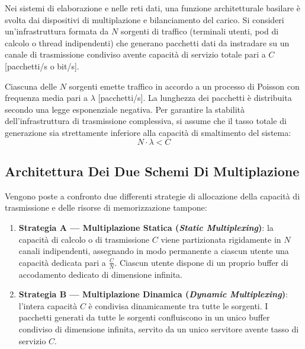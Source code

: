 \documentclass[11pt, a4paper]{article}
\begin{document}
Nei sistemi di elaborazione e nelle reti dati, una funzione architetturale basilare è svolta dai dispositivi di multiplazione e bilanciamento del carico. Si consideri un'infrastruttura formata da $N$ sorgenti di traffico (terminali utenti, pod di calcolo o thread indipendenti) che generano pacchetti dati da instradare su un canale di trasmissione condiviso avente capacità di servizio totale pari a $C$ [pacchetti/s o bit/s].


Ciascuna delle $N$ sorgenti emette traffico in accordo a un processo di Poisson con frequenza media pari a $\lambda$ [pacchetti/s]. La lunghezza dei pacchetti è distribuita secondo una legge esponenziale negativa. Per garantire la stabilità dell'infrastruttura di trasmissione complessiva, si assume che il tasso totale di generazione sia strettamente inferiore alla capacità di smaltimento del sistema:
\[
N \cdot \lambda < C
\]

\subsection{Architettura Dei Due Schemi Di Multiplazione}

Vengono poste a confronto due differenti strategie di allocazione della capacità di trasmissione e delle risorse di memorizzazione tampone:
\begin{enumerate}
    \item \textbf{Strategia A — Multiplazione Statica (\emph{Static Multiplexing})}: la capacità di calcolo o di trasmissione $C$ viene partizionata rigidamente in $N$ canali indipendenti, assegnando in modo permanente a ciascun utente una capacità dedicata pari a $\frac{C}{N}$. Ciascun utente dispone di un proprio buffer di accodamento dedicato di dimensione infinita.
    \item \textbf{Strategia B — Multiplazione Dinamica (\emph{Dynamic Multiplexing})}: l'intera capacità $C$ è condivisa dinamicamente tra tutte le sorgenti. I pacchetti generati da tutte le sorgenti confluiscono in un unico buffer condiviso di dimensione infinita, servito da un unico servitore avente tasso di servizio $C$.
\end{enumerate}

\end{document}
